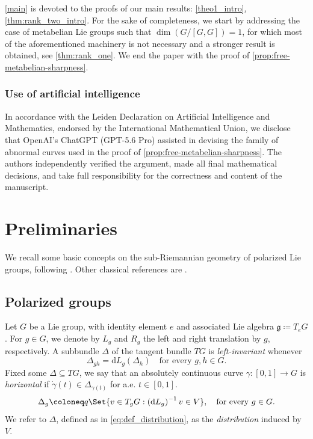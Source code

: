 \documentclass[a4paper,11pt,reqno]{amsart}
\theoremstyle{plain}
\theoremstyle{definition}
\newcommand{\g}{\mathfrak{g}}
\newcommand{\id}{e}
\newcommand{\de}{\mathrm{d}}
\begin{document}
\cref{main} is devoted to the proofs of our main results: \cref{theo1_intro}, \cref{thm:rank_two_intro}. For the sake of completeness, we start by addressing the case of metabelian Lie groups such that $\dim(G/[G,G])=1$, for which most of the aforementioned machinery is not necessary and a stronger result is obtained, see \cref{thm:rank_one}. We end the paper with the proof of \cref{prop:free-metabelian-sharpness}.

\subsubsection*{\bf Use of artificial intelligence}

In accordance with the Leiden Declaration on Artificial Intelligence and Mathematics, endorsed by the International Mathematical Union, we disclose that OpenAI's ChatGPT (GPT-5.6 Pro) assisted in devising the family of abnormal curves used in the proof of \cref{prop:free-metabelian-sharpness}. The authors independently verified the argument, made all final mathematical decisions, and take full responsibility for the correctness and content of the manuscript.
	
\section{Preliminaries} \label{prel}

We recall some basic concepts on the sub-Riemannian geometry of polarized Lie groups, following \cite{donne2024metricliegroupscarnotcaratheodory}. Other classical references are \cite{MR3971262,MR1867362,MR3308395}.

\subsection{Polarized groups} Let $G$ be a 
Lie group, with identity element $\id$ and associated Lie algebra $\g \coloneq  T_\id G$. For $g \in G$, we denote by $L_g$ and $R_g$ the left and right translation by $g$, respectively. A subbundle $\Delta$ of the tangent bundle $TG$ is \emph{left-invariant} whenever
	\begin{equation*}
		\Delta_{g h} = \de L_g(\Delta_h) \quad \text{for every $g,h \in G$.}
	\end{equation*}
Fixed some $\Delta \subseteq TG$, we say that an absolutely continuous curve $\gamma \colon [0,1] \to G$ is \emph{horizontal} if $\dot\gamma(t)\in \Delta_{\gamma(t)}$ for a.e. $t\in[0,1]$.    
\begin{equation} \label{eq:def_distribution}
    \Delta_g \coloneq q \Set{ v \in T_gG : \left(\de L_g\right)^{-1}v \in V}, \quad \text{for every $g \in G$.}
\end{equation}
We refer to $\Delta$, defined as in \eqref{eq:def_distribution}, as the \emph{distribution} induced by $V$. 
    
\end{document}
